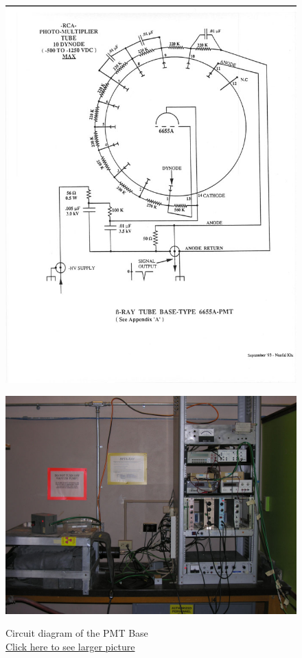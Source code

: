 \documentclass{../lab}
\begin{document}
\begin{figure}[!h]
  \href{http://experimentationlab.berkeley.edu/sites/default/files/images/RCA6655A_PMT_3.jpg}{\includegraphics[width=\linewidth,keepaspectratio]{images/RCA6655A_PMT_3.jpg}}
  \caption{Circuit diagram of the PMT Base \\
  \href{http://experimentationlab.berkeley.edu/sites/default/files/images/RCA6655A_PMT_3.jpg}{Click here to see larger picture}}
  \label{fig:BRayTube}
\endminipage\hfill
{}
  \href{http://experimentationlab.berkeley.edu/sites/default/files/images/BRA_Rack_1.jpg}{\includegraphics[width=\linewidth,keepaspectratio]{images/BRA_Rack_1.jpg}}

\end{figure}
\end{document}
